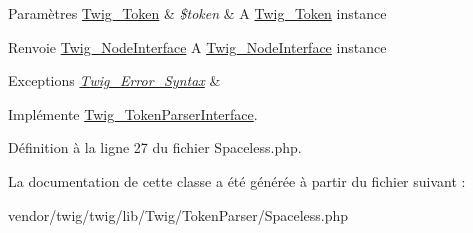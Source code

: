 \begin{DoxyParams}[1]{Paramètres}
\hyperlink{class_twig___token}{Twig\+\_\+\+Token} & {\em \$token} & A \hyperlink{class_twig___token}{Twig\+\_\+\+Token} instance\\
\hline
\end{DoxyParams}
\begin{DoxyReturn}{Renvoie}
\hyperlink{interface_twig___node_interface}{Twig\+\_\+\+Node\+Interface} A \hyperlink{interface_twig___node_interface}{Twig\+\_\+\+Node\+Interface} instance
\end{DoxyReturn}

\begin{DoxyExceptions}{Exceptions}
{\em \hyperlink{class_twig___error___syntax}{Twig\+\_\+\+Error\+\_\+\+Syntax}} & \\
\hline
\end{DoxyExceptions}


Implémente \hyperlink{interface_twig___token_parser_interface_a5dfa2e269321584fb74e8b43dabe0efd}{Twig\+\_\+\+Token\+Parser\+Interface}.



Définition à la ligne 27 du fichier Spaceless.\+php.



La documentation de cette classe a été générée à partir du fichier suivant \+:\begin{DoxyCompactItemize}
\item 
vendor/twig/twig/lib/\+Twig/\+Token\+Parser/Spaceless.\+php\end{DoxyCompactItemize}
